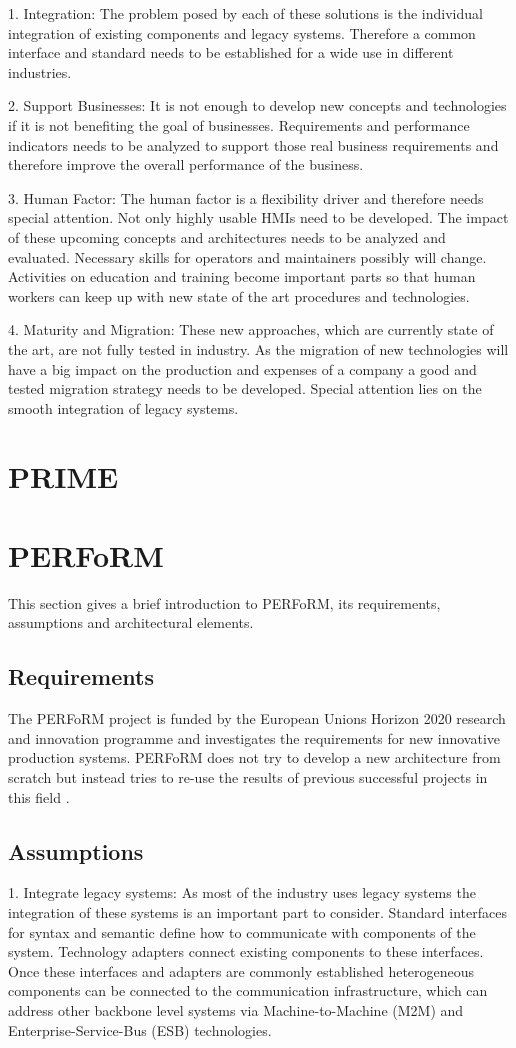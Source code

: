 \documentclass[conference,compsoc]{IEEEtran}
\begin{document}
1. Integration: The problem posed by each of these solutions is the individual integration of existing components and legacy systems. Therefore a common interface and standard needs to be established for a wide use in different industries.

2. Support Businesses: It is not enough to develop new concepts and technologies if it is not benefiting the goal of businesses. Requirements and performance indicators needs to be analyzed to support those real business requirements and therefore improve the overall performance of the business.

3. Human Factor:  The human factor is a flexibility driver and therefore needs special attention. Not only highly usable HMIs need to be developed. The impact of these upcoming concepts and architectures needs to be analyzed and evaluated. Necessary skills for operators and maintainers possibly will change. Activities on education and training become important parts so that human workers can keep up with new state of the art procedures and technologies.

4. Maturity and Migration: These new approaches, which are currently state of the art, are not fully tested in industry. As the migration of new technologies will have a big impact on the production and expenses of a company a good and tested migration strategy needs to be developed. Special attention lies on the smooth integration of legacy systems.

\section{PRIME} %
\lipsum[1-10]
\section{PERFoRM} %
This section gives a brief introduction to PERFoRM, its requirements, assumptions and architectural elements.
\subsection{Requirements}
The PERFoRM project is funded by the European Unions Horizon 2020 research and innovation programme and investigates the requirements for new innovative production systems. PERFoRM does not try to develop a new architecture from scratch but instead tries to re-use the results of previous successful projects in this field \cite{SpecPERFoRM}. 
\subsection{Assumptions}
1. Integrate legacy systems: As most of the industry uses legacy systems the integration of these systems is an important part to consider. Standard interfaces for syntax and semantic define how to communicate with components of the system. Technology adapters connect existing components to these interfaces. Once these interfaces and adapters are commonly established heterogeneous components can be connected to the communication infrastructure, which can address other backbone level systems via Machine-to-Machine (M2M) and Enterprise-Service-Bus (ESB) technologies.
\end{document}
